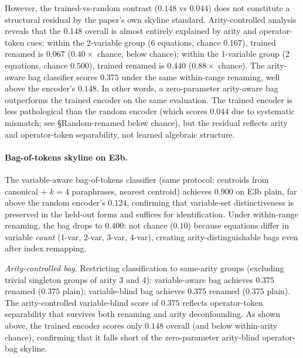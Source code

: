 However, the trained-vs-random contrast ($0.148$ vs $0.044$) does not constitute a structural residual by the paper's own skyline standard. Arity-controlled analysis reveals that the 0.148 overall is almost entirely explained by arity and operator-token cues: within the 2-variable group (6 equations, chance $0.167$), trained renamed is $0.067$ ($0.40\times$ chance, below chance); within the 1-variable group (2 equations, chance $0.500$), trained renamed is $0.440$ ($0.88\times$ chance). The arity-aware bag classifier scores $0.375$ under the same within-range renaming, well above the encoder's $0.148$. In other words, a zero-parameter arity-aware bag outperforms the trained encoder on the same evaluation. The trained encoder is less pathological than the random encoder (which scores $0.044$ due to systematic mismatch; see §Random-renamed below chance), but the residual reflects arity and operator-token separability, not learned algebraic structure.

\paragraph{Bag-of-tokens skyline on E3b.} The variable-aware bag-of-tokens classifier (same protocol: centroids from canonical + $k{=}4$ paraphrases, nearest centroid) achieves $0.900$ on E3b plain, far above the random encoder's $0.124$, confirming that variable-set distinctiveness is preserved in the held-out forms and suffices for identification. Under within-range renaming, the bag drops to $0.400$: not chance ($0.10$) because equations differ in variable \emph{count} (1-var, 2-var, 3-var, 4-var), creating arity-distinguishable bags even after index remapping.

\emph{Arity-controlled bag.} Restricting classification to same-arity groups (excluding trivial singleton groups of arity 3 and 4): variable-aware bag achieves $0.375$ renamed ($0.375$ plain); variable-blind bag achieves $0.375$ renamed ($0.375$ plain). The arity-controlled variable-blind score of $0.375$ reflects operator-token separability that survives both renaming and arity deconfounding. As shown above, the trained encoder scores only $0.148$ overall (and below within-arity chance), confirming that it falls short of the zero-parameter arity-blind operator-bag skyline.

